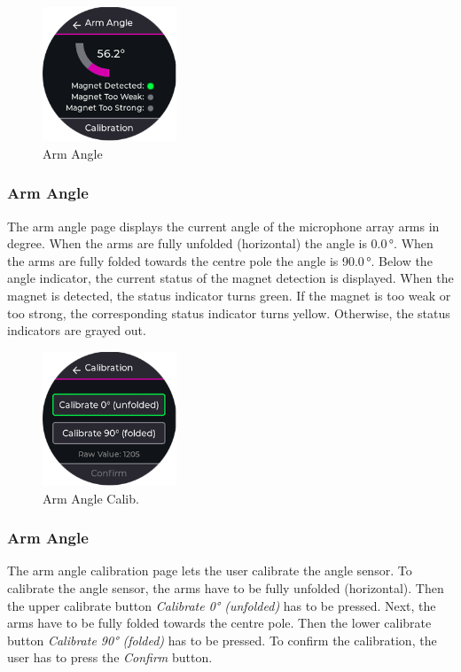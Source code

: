 \begin{minipage}{\linewidth}
	\begin{figure}
		\vspace{-0.6cm}
		\includegraphics[width=4cm]{images/6_design_final/gui/10_angle_sensor.png}
		\centering
		\caption{Arm Angle}
		\label{fig:final_design_gui_arm_angle}
	\end{figure}
	\subsubsection{Arm Angle}
	The arm angle page displays the current angle of the microphone array arms in degree.
	When the arms are fully unfolded (horizontal) the angle is 0.0\,°.
	When the arms are fully folded towards the centre pole the angle is 90.0\,°.
	Below the angle indicator, the current status of the magnet detection is displayed.
	When the magnet is detected, the status indicator turns green.
	If the magnet is too weak or too strong, the corresponding status indicator turns yellow.
	Otherwise, the status indicators are grayed out.
\end{minipage}
\vspace{0.0cm}

\begin{minipage}{\linewidth}
	\begin{figure}
		\vspace{-0.6cm}
		\includegraphics[width=4cm]{images/6_design_final/gui/11_angle_sensor_calibration.png}
		\centering
		\caption{Arm Angle Calib.}
		\label{fig:final_design_gui_arm_angle_calibration}
	\end{figure}
	\subsubsection{Arm Angle}
	The arm angle calibration page lets the user calibrate the angle sensor.
	To calibrate the angle sensor, the arms have to be fully unfolded (horizontal).
	Then the upper calibrate button \textit{Calibrate 0° (unfolded)} has to be pressed.
	Next, the arms have to be fully folded towards the centre pole.
	Then the lower calibrate button \textit{Calibrate 90° (folded)} has to be pressed.
	To confirm the calibration, the user has to press the \textit{Confirm} button.
\end{minipage}
\vspace{0.0cm}

